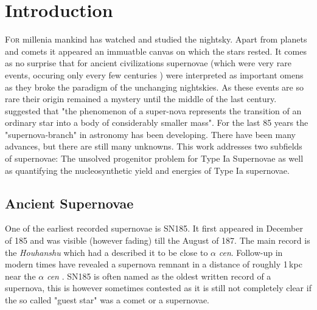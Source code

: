 \chapter{Introduction}
\label{chap:intro}

\lettrine[lines=4]{F}{or} millenia mankind has watched and studied the nightsky. Apart from planets and comets it appeared an immuatble canvas on which the stars rested. It comes as no surprise that for ancient civilizations supernovae (which were very rare events, occuring only every few centuries ) were interpreted as important omens as they broke the paradigm of the unchanging nightskies. As these events are so rare their origin remained a mystery until the middle of the last century. \citet{1934PNAS...20..254B} suggested that "the phenomenon of a super-nova represents the transition of an ordinary star into a body of considerably smaller mass". For the last 85 years the "supernova-branch" in astronomy has been developing. There have been many advances, but there are still many unknowns. This work addresses two subfields of supernovae: The unsolved progenitor problem for Type Ia Supernovae as well as quantifying the nucleosynthetic yield and energies of Type Ia supernovae.


\section{Ancient Supernovae}
\label{sec:ancientsn}

One of the earliest recorded supernovae is SN185. It first appeared in December of 185 and was visible (however fading) till the August of 187. The main record is the \textit{Houhanshu} \citep{2006ChJAA...6..635Z} which had a described it to be close to $\alpha$ \textit{cen}. Follow-up in modern times have revealed a supernova remnant in a distance of roughly 1\,kpc near the $\alpha$ \textit{cen} \citep{2006ChJAA...6..635Z}. SN185 is often named as the oldest written record of a supernova, this is however sometimes contested as it is still not completely clear if the so called "guest star" was a comet or a supernovae. 

